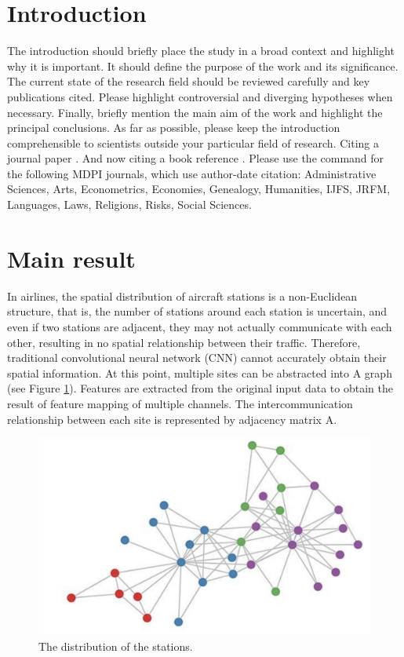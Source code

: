 \documentclass[journal,article,submit,moreauthors,pdftex]{Definitions/mdpi}
\begin{document}
\section{Introduction}
The introduction should briefly place the study in a broad context and highlight why it is important. It should define the purpose of the work and its significance. The current state of the research field should be reviewed carefully and key publications cited. Please highlight controversial and diverging hypotheses when necessary. Finally, briefly mention the main aim of the work and highlight the principal conclusions. As far as possible, please keep the introduction comprehensible to scientists outside your particular field of research. Citing a journal paper \cite{ref-journal}. And now citing a book reference \cite{ref-book}. Please use the command \citep{ref-journal} for the following MDPI journals, which use author-date citation: Administrative Sciences, Arts, Econometrics, Economies, Genealogy, Humanities, IJFS, JRFM, Languages, Laws, Religions, Risks, Social Sciences.
\section{Main result}
In airlines, the spatial distribution of aircraft stations is a non-Euclidean structure, that is, the number of stations around each station is uncertain, and even if two stations are adjacent, they may not actually communicate with each other, resulting in no spatial relationship between their traffic. Therefore, traditional convolutional neural network (CNN) cannot accurately obtain their spatial information. At this point, multiple sites can be abstracted into A graph (see Figure \ref{fig:stations}). Features are extracted from the original input data to obtain the result of feature mapping of multiple channels. The intercommunication relationship between each site is represented by adjacency matrix A.
\begin{figure}[htp]
    \centering
    \includegraphics[width=8 cm]{imgs/GCN.png}
    \caption{The distribution of the stations.}
    \label{fig:stations}
\end{figure}
\end{document}
